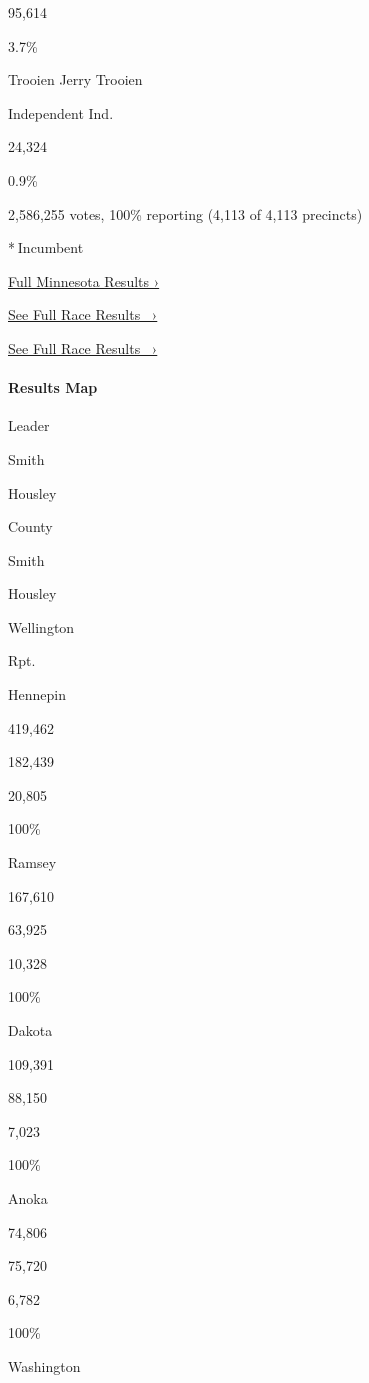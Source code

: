 95,614

3.7\%

 Trooien Jerry Trooien

Independent Ind.

24,324

0.9\%

2,586,255 votes, 100\% reporting (4,113 of 4,113 precincts)

* Incumbent

\href{https://www.nytimes3xbfgragh.onion/interactive/2018/11/06/us/elections/results-minnesota-elections.html}{Full
Minnesota Results ›}

\href{https://www.nytimes3xbfgragh.onion/elections/results/minnesota-senate-special}{See
Full Race Results~ ›}

\href{https://www.nytimes3xbfgragh.onion/elections/results/minnesota-senate-special}{See
Full Race Results~ ›}

\hypertarget{results-map-1}{%
\paragraph{Results Map}\label{results-map-1}}

Leader

 Smith

 Housley

County

Smith

Housley

Wellington

Rpt.

Hennepin

419,462

182,439

20,805

100\%

Ramsey

167,610

63,925

10,328

100\%

Dakota

109,391

88,150

7,023

100\%

Anoka

74,806

75,720

6,782

100\%

Washington

